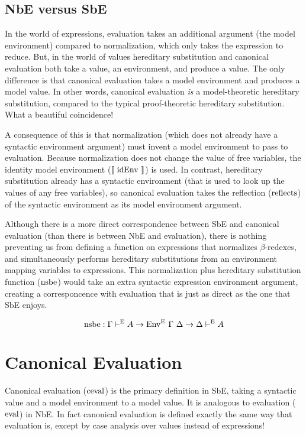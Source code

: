 \documentclass{llncs}
\def\marr{\rightarrow}
\def\reflecte{\fun{reflects}}
\def\eval{\fun{eval}}
\def\cevalv{\fun{ceval}}
\def\nsbe{\fun{nsbe}}
\def\midenv{\el{\fun{idEnv}}}
\newcommand{\turn}[1]{\vdash^\con{#1}}
\newcommand{\el}[1]{\llbracket ~ #1 ~ \rrbracket}
\newcommand{\con}[1]{\textmd{#1}}
\newcommand{\fun}[1]{\textmd{#1}}
\newcommand{\type}[1]{\Gamma \turn{E} #1}
\newcommand{\dtype}[1]{\Delta \turn{E} #1}
\def\enve{\fun{Env}^\con{E}~\Gamma~\Delta}
\begin{document}
\subsection{NbE versus SbE}

In the world of expressions,
evaluation takes an additional argument (the model environment) compared
to normalization, which only takes the expression to reduce. But, in
the world of values hereditary substitution and canonical evaluation
both take a value, an environment, and produce a value. The only
difference is that canonical evaluation takes a model environment and
produces a model value. 
In other words, canonical evaluation \textit{is}
a model-theoretic hereditary substitution, compared to the typical
proof-theoretic hereditary substitution.
What a beautiful coincidence!

A consequence of this is that normalization (which does not already
have a syntactic environment argument) must invent a model
environment to pass to evaluation. Because normalization does not
change the value of free variables, the identity model environment
($\midenv$) is used. In contrast, hereditary substitution already has
a syntactic environment (that is used to look up the values of any free
variables), so canonical evaluation takes the 
reflection ($\reflecte$) of the syntactic environment as its model
environment argument.

Although there is a more direct correspondence between SbE and canonical
evaluation (than there is between NbE and evaluation), there is
nothing preventing us from defining a function on expressions that
normalizes $\beta$-redexes, and simultaneously performs hereditary
substitutions from an environment mapping variables to expressions.
This normalization plus hereditary substitution function ($\nsbe$) would take an
extra syntactic expression environment argument, creating a
corresponcence with evaluation that is just as direct as the one that
SbE enjoys.

$$
\nsbe : \type{A} \marr \enve \marr \dtype{A}
$$


\section{Canonical Evaluation}
\label{sec:vmod}

Canonical evaluation ($\cevalv$) is the primary definition in SbE, taking a
syntactic value and a model environment to a model value. It is
analogous to evaluation ($\eval$) in NbE. In fact canonical evaluation
is defined exactly the same way that evaluation is, except by case
analysis over values instead of expressions!
\end{document}
